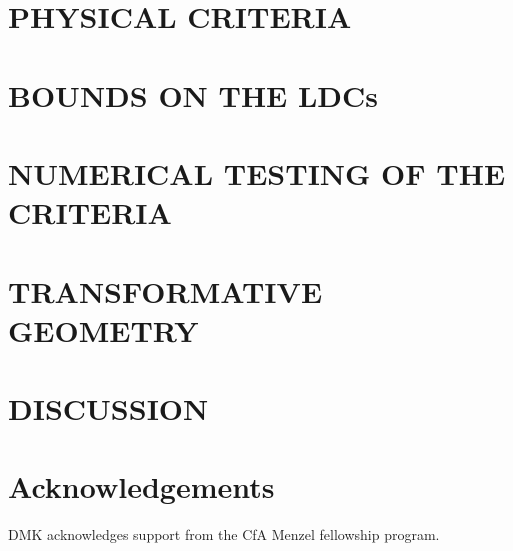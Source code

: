 \documentclass[a4paper,fleqn,usenatbib]{mnras}
\begin{document}


\section{PHYSICAL CRITERIA}
\label{sec:criteria}



\section{BOUNDS ON THE LDC\tiny{s}}
\label{sec:bounds}



\section{NUMERICAL TESTING OF THE CRITERIA}
\label{sec:criteria_tests}



\section{TRANSFORMATIVE GEOMETRY}
\label{sec:transformations}



\section{DISCUSSION}
\label{sec:discussion}



\section*{Acknowledgements}

DMK acknowledges support from the CfA Menzel fellowship program.




%


\begin{thebibliography}{99}

\end{thebibliography}
\end{document}
